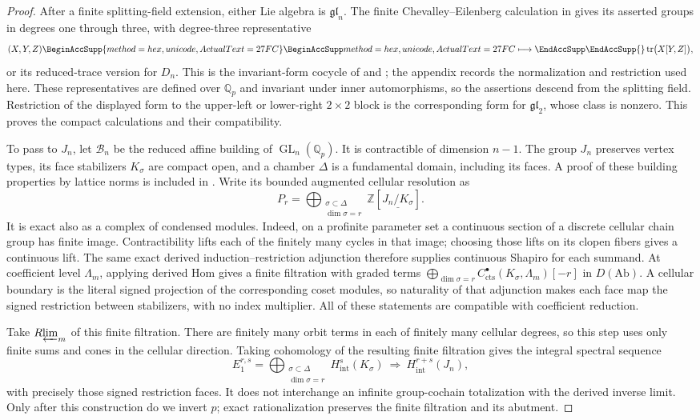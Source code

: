\documentclass[11pt]{article}
\numberwithin{equation}{section}
\theoremstyle{definition}
\theoremstyle{remark}
\newcommand{\Q}{\mathbb Q}
\newcommand{\Z}{\mathbb Z}
\newcommand{\cts}{\mathrm{cts}}
\DeclareMathOperator{\GL}{GL}
\DeclareMathOperator{\tr}{tr}
\newcommand{\Rlim}{R\!\varprojlim}
\let\UnicodeOriginalLongmapsto\longmapsto
\DeclareRobustCommand{\longmapsto}{
  \BeginAccSupp{method=hex,unicode,ActualText=27FC}
  \UnicodeOriginalLongmapsto\EndAccSupp{}}
\begin{document}
\begin{proof}
After a finite splitting-field extension, either Lie algebra is
$\mathfrak{gl}_n$.  The finite Chevalley--Eilenberg calculation in
 gives its asserted groups in degrees one through
three, with degree-three representative
\[
 (X,Y,Z)\longmapsto\tr\bigl(X[Y,Z]\bigr),
\]
or its reduced-trace version for $D_n$.
This is the invariant-form cocycle of
\cite[\S21]{ChevalleyEilenberg1948} and \cite[\S11]{Koszul1950};
the appendix records the normalization and restriction used here.
These representatives are defined over $\Q_p$ and invariant under
inner automorphisms, so the assertions descend from the splitting
field.  Restriction of the displayed form to the upper-left or
lower-right $2\times2$ block is the corresponding form for
$\mathfrak{gl}_2$, whose class is nonzero.  This proves the compact
calculations and their compatibility.

To pass to $J_n$, let $\mathcal B_n$ be the reduced affine building
of $\GL_n(\Q_p)$.  It is contractible of dimension $n-1$.
The group $J_n$ preserves vertex types, its face stabilizers
$K_\sigma$ are compact open, and a chamber $\Delta$ is a
fundamental domain, including its faces.  A proof of these building
properties by lattice norms is included in .
Write its bounded augmented cellular resolution as
\[
 P_r=\bigoplus_{\substack{\sigma\subset\Delta\\\dim\sigma=r}}
       \Z[\underline{J_n/K_\sigma}].
\]
It is exact also as a complex of condensed modules. Indeed, on a
profinite parameter set a continuous section of a discrete cellular
chain group has finite image. Contractibility lifts each of the finitely
many cycles in that image; choosing those lifts on its clopen fibers
gives a continuous lift. The same exact derived induction--restriction
adjunction therefore supplies continuous Shapiro for each summand.
At coefficient level \(\Lambda_m\), applying derived Hom gives a finite
filtration with graded terms
\(\bigoplus_{\dim\sigma=r}C_{\cts}^{\bullet}(K_\sigma,\Lambda_m)[-r]\)
in \(D(\mathrm{Ab})\).
A cellular boundary is the literal signed projection of the corresponding
coset modules, so naturality of that adjunction makes each face map the
signed restriction between stabilizers, with no index multiplier.
All of these statements are compatible with coefficient reduction.

Take \(\Rlim_m\) of this finite filtration. There are finitely many
orbit terms in each of finitely many cellular degrees, so this step uses
only finite sums and cones in the cellular direction. Taking cohomology of
the resulting finite filtration gives the integral spectral sequence
\[
 E_1^{r,s}=
 \bigoplus_{\substack{\sigma\subset\Delta\\\dim\sigma=r}}
 H^s_{\mathrm{int}}(K_\sigma)
 \ \Longrightarrow\ H^{r+s}_{\mathrm{int}}(J_n),
\]
with precisely those signed restriction faces. It does not interchange
an infinite group-cochain totalization with the derived inverse limit.
Only after this construction do we invert \(p\); exact rationalization
preserves the finite filtration and its abutment.


\end{proof}
\end{document}
